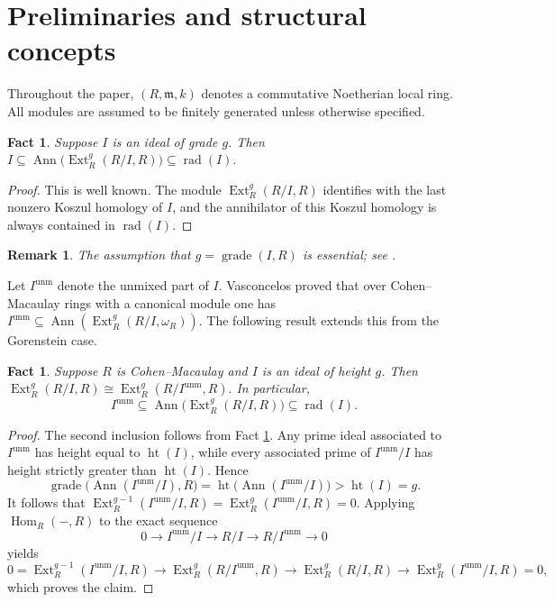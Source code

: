 \documentclass[11pt,a4paper]{amsart}
\numberwithin{equation}{section}
\newtheorem{remark}[theorem]{Remark}
\newtheorem{fact}[theorem]{Fact}
\DeclareMathOperator{\grade}{grade}
\DeclareMathOperator{\Ann}{Ann}\DeclareMathOperator{\ann}{Ann}
\DeclareMathOperator{\unm}{unm}
\DeclareMathOperator{\rad}{rad}
\DeclareMathOperator{\Ht}{ht}
\DeclareMathOperator{\Ext}{Ext}
\DeclareMathOperator{\Hom}{Hom}
\newcommand{\fm}{\mathfrak{m}}
\begin{document}
	\maketitle
	
	
\section{Preliminaries and  structural concepts}

Throughout the paper, $(R,\fm,k)$ denotes a commutative Noetherian local ring. All modules are assumed to be finitely generated unless otherwise specified.


\begin{fact}\label{k}
	Suppose $I$ is an ideal of grade $g$. Then
	\(
	I \subseteq \Ann\!\bigl(\Ext^{g}_R(R/I ,R)\bigr)\subseteq \rad(I).
	\)
\end{fact}

\begin{proof}
	This is well known. The module $\Ext^{g}_R(R/I,R)$ identifies with the last nonzero Koszul homology of $I$, and the annihilator of this Koszul homology is always contained in $\rad(I)$.
\end{proof}

\begin{remark}
	The assumption that $g=\grade(I,R)$ is essential; see \cite{syz,supp}.
\end{remark}

Let $I^{\unm}$ denote the unmixed part of $I$. Vasconcelos proved that over Cohen–Macaulay rings with a canonical module one has
\(
I^{\unm}\subseteq \Ann(\Ext^{g}_R(R/I ,\omega_R)).
\)
The following result extends this from the Gorenstein case.

\begin{fact}\label{usi}
	Suppose $R$ is Cohen–Macaulay and $I$ is an ideal of height $g$. Then
	\(
	\Ext^{g}_R(R/I ,R) \cong \Ext^{g}_R(R/I^{\unm} ,R).
	\)
	In particular,
	\[
	I^{\unm}\subseteq \Ann\!\bigl(\Ext^{g}_R(R/I ,R)\bigr)\subseteq \rad(I).
	\]
\end{fact}

\begin{proof}
	The second inclusion follows from Fact \ref{k}. Any prime ideal associated to $I^{\unm}$ has height equal to $\Ht(I)$, while every associated prime of $I^{\unm}/I$ has height strictly greater than $\Ht(I)$. Hence
	\[
	\grade\!\bigl(\Ann(I^{\unm}/I),R\bigr)=\Ht\!\bigl(\Ann(I^{\unm}/I)\bigr)>\Ht(I)=g.
	\]
	It follows that
	\(
	\Ext^{g-1}_R(I^{\unm}/I,R)=\Ext^{g}_R(I^{\unm}/I,R)=0.
	\)
	Applying $\Hom_R(-,R)$ to the exact sequence
	\[
	0 \longrightarrow I^{\unm}/I \longrightarrow R/I \longrightarrow R/I^{\unm} \longrightarrow 0
	\]
	yields
	\[
	0=\Ext^{g-1}_R(I^{\unm}/I,R) \longrightarrow \Ext^{g}_R(R/I^{\unm} ,R) \longrightarrow \Ext^{g}_R(R/I ,R) \longrightarrow \Ext^{g}_R(I^{\unm}/I,R)=0,
	\]
	which proves the claim.
\end{proof}
\end{document}
